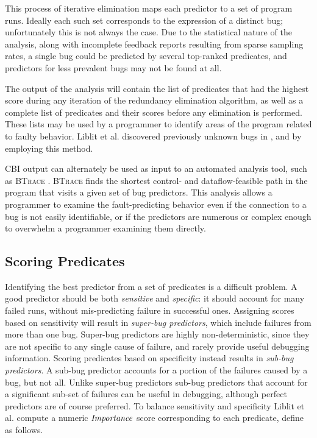 This process of iterative elimination maps each predictor to a set of program runs.  Ideally each such set corresponds to the expression of a distinct bug; unfortunately this is not always the case.  Due to the statistical nature of the analysis, along with incomplete feedback reports resulting from sparse sampling rates, a single bug could be predicted by several top-ranked predicates, and predictors for less prevalent bugs may not be found at all.

The output of the analysis will contain the list of predicates that had the highest score during any iteration of the redundancy elimination algorithm, as well as a complete list of predicates and their scores before any elimination is performed.  These lists may be used by a programmer to identify areas of the program related to faulty behavior.  Liblit et al. discovered previously unknown bugs in  \cite{Liblit:2003:BIRPS},  \cite{Liblit:2005:SSBI} and  \cite{Liblit:2005:SSBI} by employing this method.

CBI output can alternately be used as input to an automated analysis tool, such as \textsc{BTrace} \cite{Lal:2006:POPAD}. \textsc{BTrace} finds the shortest control- and dataflow-feasible path in the program that visits a given set of bug predictors.  This analysis allows a programmer to examine the fault-predicting behavior even if the connection to a bug is not easily identifiable, or if the predictors are numerous or complex enough to overwhelm a programmer examining them directly.

\subsection{Scoring Predicates}
\label{sec-scoring}
Identifying the best predictor from a set of predicates is a difficult problem.  A good predictor should be both \emph{sensitive} and \emph{specific}: it should account for many failed runs, without mis-predicting failure in successful ones.  Assigning scores based on sensitivity will result in \emph{super-bug predictors}, which include failures from more than one bug.  Super-bug predictors are highly non-deterministic, since they are not specific to any single cause of failure, and rarely provide useful debugging information.  Scoring predicates based on specificity instead results in \emph{sub-bug predictors}.  A sub-bug predictor accounts for a portion of the failures caused by a bug, but not all.  Unlike super-bug predictors sub-bug predictors that account for a significant sub-set of failures can be useful in debugging, although perfect predictors are of course preferred.  To balance sensitivity and specificity Liblit et al. \cite{Liblit:2005:SSBI} compute a numeric $\mathit{Importance}$ score corresponding to each predicate, define as follows.

